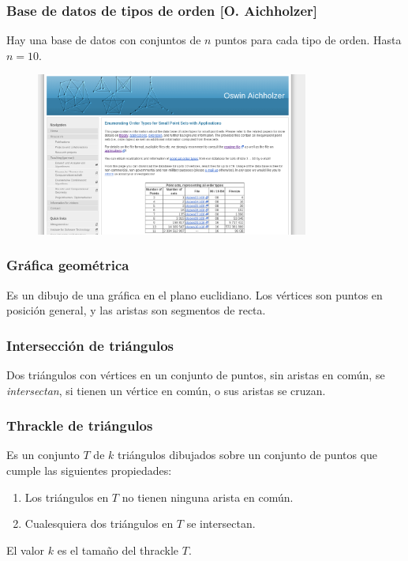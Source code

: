 \documentclass{beamer}
\begin{document}
\begin{frame}
  \frametitle{Base de datos de tipos de orden [O. Aichholzer]}
  Hay una base de datos con conjuntos de $n$ puntos para cada tipo de orden.
  Hasta $n=10$.
  \begin{figure}[htb]
    \includegraphics[width=0.8\textwidth]{base_de_datos.png}
  \end{figure}
\end{frame}

\begin{frame}
  \frametitle{Gráfica geométrica}
  \begin{block}{}
    Es un dibujo de una gráfica en el plano euclidiano. Los vértices son
    puntos en posición general, y las aristas son segmentos de recta.
  \end{block}
  \begin{figure}[htb]
    \centering
    
  \end{figure}
\end{frame}

\begin{frame}
  \frametitle{Intersección de triángulos}

  \begin{block}{}
    Dos triángulos con vértices en un conjunto de puntos, sin aristas en común,
    se \emph{intersectan}, si tienen un vértice en común, o sus aristas se
    cruzan.
  \end{block}
  \begin{figure}[htb]
    \centering
    
  \end{figure}
\end{frame}

\begin{frame}
  \frametitle{Thrackle de triángulos}
  \begin{block}{}
    Es un conjunto $T$ de $k$ triángulos dibujados sobre un conjunto de
    puntos que cumple las siguientes propiedades:
    \begin{enumerate}
      \item Los triángulos en $T$ no tienen ninguna arista en común.
      \item Cualesquiera dos triángulos en $T$ se intersectan.
    \end{enumerate}
    El valor $k$ es el tamaño del thrackle $T$.
  \end{block}
  \begin{figure}[htb]
    \centering
    
  \end{figure}
\end{frame}
\end{document}
